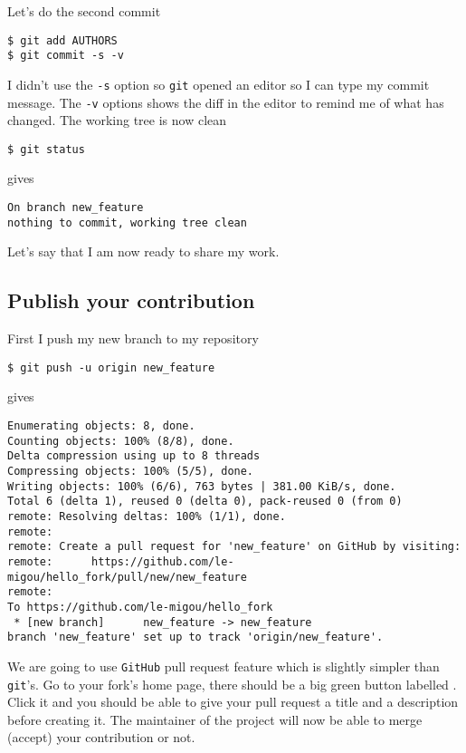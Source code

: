\documentclass[a4paper]{article}
\newcommand{\GIT}{\texttt{git}\xspace}
\newcommand{\GH}{\texttt{GitHub}\xspace}
\begin{document}
Let's do the second commit
\begin{verbatim}
$ git add AUTHORS
$ git commit -s -v
\end{verbatim}
I didn't use the \texttt{-s} option so \GIT opened an editor so I can type my
commit message. The \texttt{-v} options shows the diff in the editor to remind
me of what has changed.
The working tree is now clean
\begin{verbatim}
$ git status
\end{verbatim}
gives
\begin{verbatim}
On branch new_feature
nothing to commit, working tree clean
\end{verbatim}
Let's say that I am now ready to share my work.

\subsection{Publish your contribution}

First I push my new branch to my repository
\begin{verbatim}
$ git push -u origin new_feature
\end{verbatim}
gives 
\begin{verbatim}
Enumerating objects: 8, done.
Counting objects: 100% (8/8), done.
Delta compression using up to 8 threads
Compressing objects: 100% (5/5), done.
Writing objects: 100% (6/6), 763 bytes | 381.00 KiB/s, done.
Total 6 (delta 1), reused 0 (delta 0), pack-reused 0 (from 0)
remote: Resolving deltas: 100% (1/1), done.
remote:
remote: Create a pull request for 'new_feature' on GitHub by visiting:
remote:      https://github.com/le-migou/hello_fork/pull/new/new_feature
remote:
To https://github.com/le-migou/hello_fork
 * [new branch]      new_feature -> new_feature
branch 'new_feature' set up to track 'origin/new_feature'.
\end{verbatim}
We are going to use \GH pull request feature which is slightly simpler than
\GIT's. Go to your fork's home page, there should be a big green button labelled
. Click it and you should be able to give
your pull request a title and a description before creating it. The maintainer
of the project will now be able to merge (accept) your contribution or not.
\end{document}
